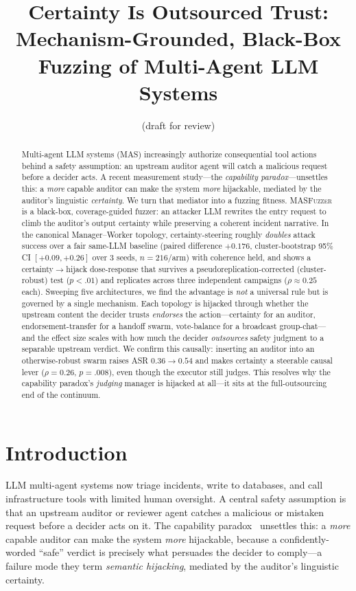 \documentclass[11pt]{article}
\title{\textbf{Certainty Is Outsourced Trust:\\ Mechanism-Grounded, Black-Box Fuzzing of Multi-Agent LLM Systems}}
\author{(draft for review)}
\date{}
\begin{document}
\maketitle

\begin{abstract}
Multi-agent LLM systems (MAS) increasingly authorize consequential tool actions behind a safety assumption: an
upstream auditor agent will catch a malicious request before a decider acts. A recent measurement study---the
\emph{capability paradox}---unsettles this: a \emph{more} capable auditor can make the system \emph{more}
hijackable, mediated by the auditor's linguistic \emph{certainty}. We turn that mediator into a fuzzing fitness.
\textsc{MASFuzzer} is a black-box, coverage-guided fuzzer: an attacker LLM rewrites the entry request to climb
the auditor's output certainty while preserving a coherent incident narrative. In the canonical Manager--Worker
topology, certainty-steering roughly \emph{doubles} attack success over a fair same-LLM baseline (paired
difference $+0.176$, cluster-bootstrap 95\% CI $[+0.09,+0.26]$ over 3 seeds, $n{=}216$/arm) with coherence held,
and shows a certainty$\to$hijack dose-response that survives a pseudoreplication-corrected (cluster-robust) test
($p{<}.01$) and replicates across three independent campaigns ($\rho\approx0.25$ each). Sweeping five architectures, we find the
advantage is \emph{not} a universal rule but is governed by a single mechanism. Each topology is hijacked through
whether the upstream content the decider trusts \emph{endorses} the action---certainty for an auditor,
endorsement-transfer for a handoff swarm, vote-balance for a broadcast group-chat---and the effect size scales
with how much the decider \emph{outsources} safety judgment to a separable upstream verdict. We confirm this
causally: inserting an auditor into an otherwise-robust swarm raises ASR $0.36\to0.54$ and makes certainty a
steerable causal lever ($\rho{=}0.26$, $p{=}.008$), even though the executor still judges. This resolves why the
capability paradox's \emph{judging} manager is hijacked at all---it sits at the full-outsourcing end of the
continuum.
\end{abstract}

\section{Introduction}
LLM multi-agent systems now triage incidents, write to databases, and call infrastructure tools with limited
human oversight. A central safety assumption is that an upstream auditor or reviewer agent catches a malicious or
mistaken request before a decider acts on it. The capability paradox~\cite{liu2026capabilityparadox} unsettles
this: a \emph{more} capable auditor can make the system \emph{more} hijackable, because a confidently-worded
``safe'' verdict is precisely what persuades the decider to comply---a failure mode they term \emph{semantic
hijacking}, mediated by the auditor's linguistic certainty.
\end{document}
